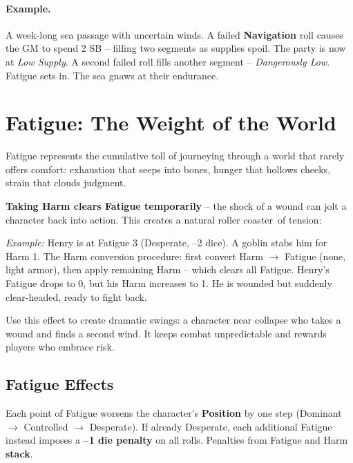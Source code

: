 \paragraph{Example.}
A week-long sea passage with uncertain winds. A failed \textbf{Navigation} roll causes the GM to spend 2 SB -- filling two segments as supplies spoil. The party is now at \textit{Low Supply}. A second failed roll fills another segment -- \textit{Dangerously Low}. Fatigue sets in. The sea gnaws at their endurance.

\section{Fatigue: The Weight of the World}
\label{sec:fatigue-gm}

Fatigue represents the cumulative toll of journeying through a world that rarely offers comfort: exhaustion that seeps into bones, hunger that hollows cheeks, strain that clouds judgment.

\begin{tcolorbox}[colback=gray!5!white, colframe=gray!75!black, title={The Roller-Coaster Effect}, label={sec:roller-coaster},breakable]

\textbf{Taking Harm clears Fatigue temporarily} -- the shock of a wound can jolt a character back into action. This creates a natural \textquotedbl roller coaster\textquotedbl\ of tension:

\medskip
\noindent\textit{Example:} Henry is at Fatigue 3 (Desperate, --2 dice). A goblin stabs him for Harm 1. The Harm conversion procedure: first convert Harm $\rightarrow$ Fatigue (none, light armor), then apply remaining Harm -- which clears all Fatigue. Henry's Fatigue drops to 0, but his Harm increases to 1. He is wounded but suddenly clear-headed, ready to fight back.

\medskip
Use this effect to create dramatic swings: a character near collapse who takes a wound and finds a second wind. It keeps combat unpredictable and rewards players who embrace risk.
\end{tcolorbox}

\subsection{Fatigue Effects}
\label{subsec:fatigue-effects}

Each point of Fatigue worsens the character's \textbf{Position} by one step (Dominant $\rightarrow$ Controlled $\rightarrow$ Desperate). If already Desperate, each additional Fatigue instead imposes a \textbf{--1 die penalty} on all rolls. Penalties from Fatigue and Harm \textbf{stack}.

